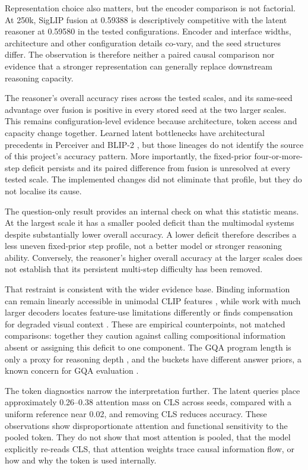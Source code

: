 Representation choice also matters, but the encoder comparison is not
factorial. At 250k, SigLIP fusion at 0.59388 is descriptively competitive with
the latent reasoner at 0.59580 in the tested configurations.
Encoder and interface widths, architecture and other configuration details
co-vary, and the seed structures differ. The observation is therefore neither
a paired causal comparison nor evidence that a stronger representation can
generally replace downstream reasoning capacity.

The reasoner's overall accuracy rises across the tested scales, and its
same-seed advantage over fusion is positive in every stored seed at the two
larger scales. This remains configuration-level evidence because architecture,
token access and capacity change together. Learned latent bottlenecks have
architectural precedents in Perceiver and BLIP-2
\citep{jaegle2021perceiver,li2023blip2}, but those lineages do not identify the
source of this project's accuracy pattern. More importantly, the fixed-prior
four-or-more-step deficit persists and its paired difference from fusion is
unresolved at every tested scale. The implemented changes did not eliminate
that profile, but they do not localise its cause.

The question-only result provides an internal check on what this statistic
means. At the largest scale it has a smaller pooled deficit than the
multimodal systems despite substantially lower overall accuracy. A lower
deficit therefore describes a less uneven fixed-prior step profile, not a
better model or stronger reasoning ability. Conversely, the reasoner's higher
overall accuracy at the larger scales does not establish that its persistent
multi-step difficulty has been removed.

That restraint is consistent with the wider evidence base. Binding information
can remain linearly accessible in unimodal CLIP features
\citep{koishigarina2026bow}, while work with much larger decoders locates
feature-use limitations differently or finds compensation for degraded visual
context \citep{fu2025hidden,takishita2025compensate}. These are empirical
counterpoints, not matched comparisons: together they caution against calling
compositional information absent or assigning this deficit to one component.
The GQA program length is only a proxy for reasoning depth
\citep{hudson2019gqa}, and the buckets have different answer priors, a known
concern for GQA evaluation \citep{kervadec2021gqaood}.

The token diagnostics narrow the interpretation further. The latent queries
place approximately 0.26--0.38 attention mass on CLS across seeds, compared
with a uniform reference near 0.02, and removing CLS reduces accuracy. These
observations show disproportionate attention and functional sensitivity to the
pooled token. They do not show that most attention is pooled, that the model
explicitly re-reads CLS, that attention weights trace causal information flow,
or how and why the token is used internally.

